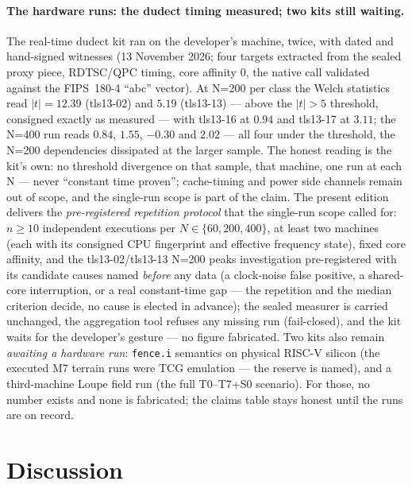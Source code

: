 \documentclass[11pt,a4paper]{article}
\newcommand{\code}[1]{\texttt{\small #1}}
\begin{document}
\paragraph{The hardware runs: the dudect timing measured; two kits still
waiting.} The real-time dudect kit ran on the developer's machine,
twice, with dated and hand-signed witnesses (13 November 2026; four
targets extracted from the sealed proxy piece, RDTSC/QPC timing, core
affinity 0, the native call validated against the FIPS~180-4 ``abc''
vector). At N=200 per class the Welch statistics read $|t| = 12.39$
(tls13-02) and $5.19$ (tls13-13) --- above the $|t|>5$ threshold,
consigned exactly as measured --- with tls13-16 at $0.94$ and tls13-17
at $3.11$; the N=400 run reads $0.84$, $1.55$, $-0.30$ and $2.02$ ---
all four under the threshold, the N=200 dependencies dissipated at the
larger sample. The honest reading is the kit's own: no threshold
divergence on that sample, that machine, one run at each N --- never
``constant time proven''; cache-timing and power side channels remain
out of scope, and the single-run scope is part of the claim. The present edition
delivers the \emph{pre-registered repetition protocol} that the
single-run scope called for: $n{\ge}10$ independent executions per
$N{\in}\{60, 200, 400\}$, at least two machines (each with its
consigned CPU fingerprint and effective frequency state), fixed core
affinity, and the tls13-02/tls13-13 N=200 peaks investigation
pre-registered with its candidate causes named \emph{before} any data
(a clock-noise false positive, a shared-core interruption, or a real
constant-time gap --- the repetition and the median criterion decide,
no cause is elected in advance); the sealed measurer is carried
unchanged, the aggregation tool refuses any missing run (fail-closed),
and the kit waits for the developer's gesture --- no figure fabricated.
Two kits also remain \emph{awaiting a hardware run}:
\code{fence.i} semantics on physical RISC-V silicon (the executed M7
terrain runs were TCG emulation --- the reserve is named), and a
third-machine Loupe field run (the full T0--T7+S0 scenario). For
those, no number exists and none is fabricated; the claims table stays
honest until the runs are on record.



\section{Discussion}\label{sec:discussion}
\end{document}
